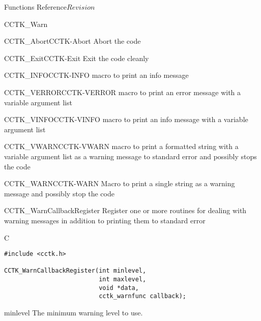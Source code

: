 \begin{cactuspart}{ Functions Reference}{}{$Revision$}
\begin{FunctionDescription}{CCTK\_Warn}
\begin{SeeAlsoSection}
\begin{SeeAlso2}{CCTK\_Abort}{CCTK-Abort}
Abort the code
\end{SeeAlso2}
\begin{SeeAlso2}{CCTK\_Exit}{CCTK-Exit}
Exit the code cleanly
\end{SeeAlso2}
\begin{SeeAlso2}{CCTK\_INFO}{CCTK-INFO}
macro to print an info message
\end{SeeAlso2}
\begin{SeeAlso2}{CCTK\_VERROR}{CCTK-VERROR}
macro to print an error message with a variable argument list
\end{SeeAlso2}
\begin{SeeAlso2}{CCTK\_VINFO}{CCTK-VINFO}
macro to print an info message with a variable argument list
\end{SeeAlso2}
\begin{SeeAlso2}{CCTK\_VWARN}{CCTK-VWARN}
macro to print a formatted string with a variable argument list as a
warning message to standard error and possibly stops the code
\end{SeeAlso2}
\begin{SeeAlso2}{CCTK\_WARN}{CCTK-WARN}
Macro to print a single string as a warning message and possibly stop the code
\end{SeeAlso2}
\end{SeeAlsoSection}
\end{FunctionDescription}



\begin{FunctionDescription}{CCTK\_WarnCallbackRegister}
\label{CCTK-WARNCallbackRegister}
Register one or more routines for dealing with warning messages in
addition to printing them to standard error

\begin{SynopsisSection}
\begin{Synopsis}{C}
\begin{verbatim}
#include <cctk.h>

CCTK_WarnCallbackRegister(int minlevel,
                          int maxlevel,
                          void *data,
                          cctk_warnfunc callback);

\end{verbatim}
\end{Synopsis}
\end{SynopsisSection}

\begin{ParameterSection}
\begin{Parameter}{minlevel}
The minimum warning level to use.


\end{Parameter}
\end{ParameterSection}
\end{FunctionDescription}
\end{cactuspart}
